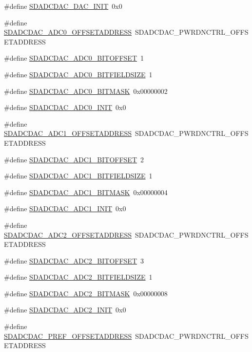 \begin{DoxyCompactItemize}
\item 
\#define \hyperlink{a00569_a2ed79913b6c5172e9e2d3af9e046abf5}{SDADCDAC\_\-DAC\_\-INIT}~0x0
\item 
\#define \hyperlink{a00569_a668923e5f581601124d6c9dfb4748d21}{SDADCDAC\_\-ADC0\_\-OFFSETADDRESS}~SDADCDAC\_\-PWRDNCTRL\_\-OFFSETADDRESS
\item 
\#define \hyperlink{a00569_a769d00145214fb9a2247eb3b5a0a0d1e}{SDADCDAC\_\-ADC0\_\-BITOFFSET}~1
\item 
\#define \hyperlink{a00569_af892c1463b5d1e0db8e19d19db1d5556}{SDADCDAC\_\-ADC0\_\-BITFIELDSIZE}~1
\item 
\#define \hyperlink{a00569_abc0cf44dde59e5893dd09c6536f2bca6}{SDADCDAC\_\-ADC0\_\-BITMASK}~0x00000002
\item 
\#define \hyperlink{a00569_a1f94131b65149b2c42edd5900ffe6750}{SDADCDAC\_\-ADC0\_\-INIT}~0x0
\item 
\#define \hyperlink{a00569_a8880d5b91fc198538b07378f41c148cd}{SDADCDAC\_\-ADC1\_\-OFFSETADDRESS}~SDADCDAC\_\-PWRDNCTRL\_\-OFFSETADDRESS
\item 
\#define \hyperlink{a00569_a07387c0f7e21c13caaa53a13bd865f38}{SDADCDAC\_\-ADC1\_\-BITOFFSET}~2
\item 
\#define \hyperlink{a00569_aa1579cab52802ac164b4ec00e8902437}{SDADCDAC\_\-ADC1\_\-BITFIELDSIZE}~1
\item 
\#define \hyperlink{a00569_a44f8aefdb11b3c47a199633af68494f7}{SDADCDAC\_\-ADC1\_\-BITMASK}~0x00000004
\item 
\#define \hyperlink{a00569_a4ffb475b75b81a7884ce05b69d526dfa}{SDADCDAC\_\-ADC1\_\-INIT}~0x0
\item 
\#define \hyperlink{a00569_aee7168e53a21f6f6b6648b3496e8d2f5}{SDADCDAC\_\-ADC2\_\-OFFSETADDRESS}~SDADCDAC\_\-PWRDNCTRL\_\-OFFSETADDRESS
\item 
\#define \hyperlink{a00569_a9de94a7051439737c1032e1bac596c8c}{SDADCDAC\_\-ADC2\_\-BITOFFSET}~3
\item 
\#define \hyperlink{a00569_a89b22082bb8abc90e00a2b4cc57e3be5}{SDADCDAC\_\-ADC2\_\-BITFIELDSIZE}~1
\item 
\#define \hyperlink{a00569_afdbcbc5cde348b7c4be73f89a220ec7d}{SDADCDAC\_\-ADC2\_\-BITMASK}~0x00000008
\item 
\#define \hyperlink{a00569_a15baa2a9906b846dfd2f7b4edcd58315}{SDADCDAC\_\-ADC2\_\-INIT}~0x0
\item 
\#define \hyperlink{a00569_ad26c99def4dd9cb0c12faee693774aa4}{SDADCDAC\_\-PREF\_\-OFFSETADDRESS}~SDADCDAC\_\-PWRDNCTRL\_\-OFFSETADDRESS
\item 

\end{DoxyCompactItemize}
